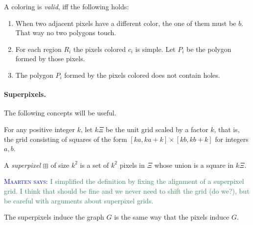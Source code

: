 \documentclass[a4paper, UKenglish]{lipics-v2018}
\newcommand{\mremark}[3]{\textcolor{blue}{\textsc{#1 #2:}} \textcolor{SeaGreen}{\textsf{#3}}}
\newcommand{\maarten}[2][says]{\mremark{Maarten}{#1}{#2}}
\newcommand{\jerome}[2][says]{\mremark{J\'er\^ome}{#1}{#2}}
\newcommand{\spix}{\boxplus}
\begin{document}
\begin{definition}
A coloring is \emph{valid}, iff the following holds:
\begin{enumerate}
	\item When two adjacent pixels have a different color, the one of them must be $b$. That way no two polygons touch.
	\item For each region $R_i$ the pixels colored $c_i$ is simple. Let $P_i$ be the polygon formed by those pixels.
	\item The polygon $P_i$ formed by the pixels colored does not contain holes.
\end{enumerate}

\end{definition}


\paragraph {Superpixels.}

The following concepts will be useful.

For any positive integer $k$, let $k\Xi$ be the unit grid scaled by a factor $k$, that is, the grid consisting of squares of the form $[ka, ka+k] \times [kb, kb+k]$ for integers $a, b$.

\begin{definition}
A \emph{superpixel} $\spix$ of size $k^2$ is a set of $k^2$ pixels in $\Xi$ whose union is a square in $k\Xi$. %
\end{definition}

\maarten {I simplified the definition by fixing the alignment of a superpixel grid. I think that should be fine and we never need to shift the grid (do we?), but be careful with arguments about superpixel grids.}

The superpixels induce the graph $G$ is the same way that the pixels induce $G$.
\end{document}
